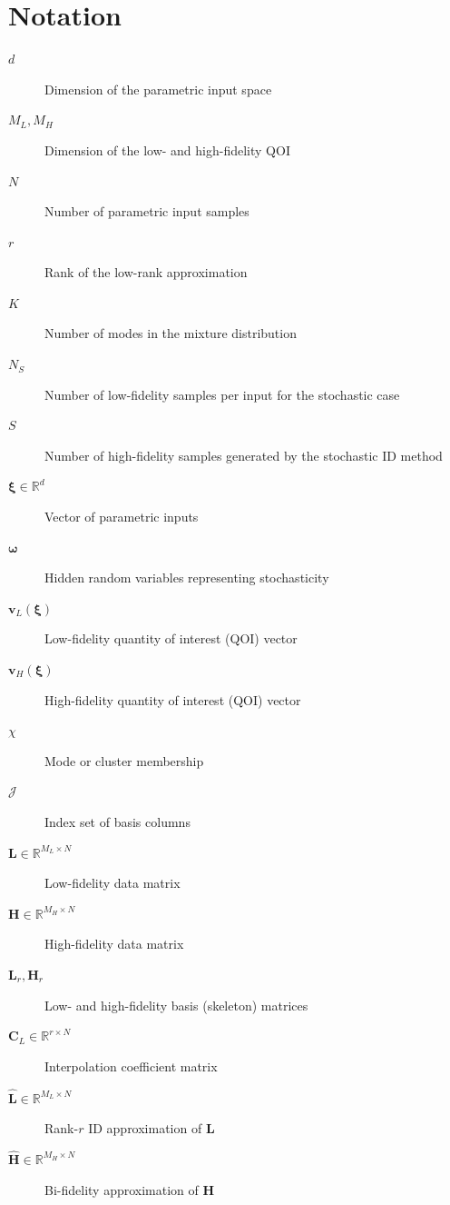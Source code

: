 \documentclass[preprint,10pt]{elsarticle}
\begin{document}
\section*{Notation}
\begin{description}
    \item[$d$] Dimension of the parametric input space
    \item[$M_L, M_H$] Dimension of the low- and high-fidelity QOI
    \item[$N$] Number of parametric input samples
    \item[$r$] Rank of the low-rank approximation
    \item[$K$] Number of modes in the mixture distribution
    \item[$N_S$] Number of low-fidelity samples per input for the stochastic case
    \item[$S$] Number of high-fidelity samples generated by the stochastic ID method

    \item[$\boldsymbol \xi \in \mathbb{R}^d$] Vector of parametric inputs
    \item[$\bm \omega$] Hidden random variables representing stochasticity
    \item[$\boldsymbol v_L(\boldsymbol\xi)$] Low-fidelity quantity of interest (QOI) vector
    \item[$\boldsymbol v_H(\boldsymbol\xi)$] High-fidelity quantity of interest (QOI) vector
    \item[$\chi$] Mode or cluster membership
    
    \item[$\mathcal{J}$] Index set of basis columns

    \item[$\bm{L} \in \mathbb{R}^{M_L \times N}$] Low-fidelity data matrix
    \item[$\bm{H} \in \mathbb{R}^{M_H \times N}$] High-fidelity data matrix
    \item[$\bm{L}_r, \bm{H}_r$] Low- and high-fidelity basis (skeleton) matrices
    \item[$\bm C_L \in \mathbb{R}^{r \times N}$] Interpolation coefficient matrix
    \item[$\widehat{\bm{L}} \in \mathbb{R}^{M_L \times N}$] Rank-$r$ ID approximation of $\bm{L}$
    \item[$\widehat{\bm{H}} \in \mathbb{R}^{M_H \times N}$] Bi-fidelity approximation of $\bm{H}$
\end{description}
\end{document}
